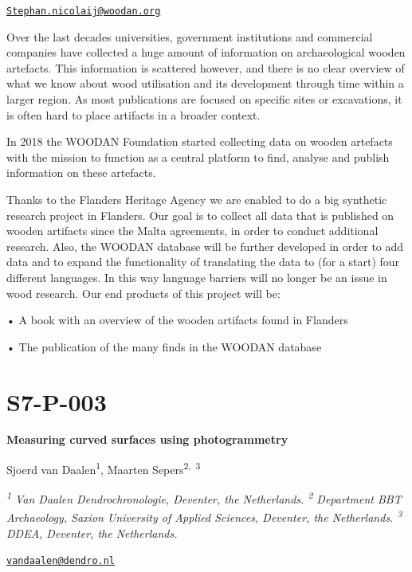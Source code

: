 \documentclass[
]{book}
\begin{document}
\href{mailto:Stephan.nicolaij@woodan.org}{\nolinkurl{Stephan.nicolaij@woodan.org}}

Over the last decades universities, government institutions and commercial companies have collected a huge amount of information on archaeological wooden artefacts. This information is scattered however, and there is no clear overview of what we know about wood utilisation and its development through time within a larger region. As most publications are focused on specific sites or excavations, it is often hard to place artifacts in a broader context.

In 2018 the WOODAN Foundation started collecting data on wooden artefacts with the mission to function as a central platform to find, analyse and publish information on these artefacts.

Thanks to the Flanders Heritage Agency we are enabled to do a big synthetic research project in Flanders. Our goal is to collect all data that is published on wooden artifacts since the Malta agreements, in order to conduct additional research. Also, the WOODAN database will be further developed in order to add data and to expand the functionality of translating the data to (for a start) four different languages. In this way language barriers will no longer be an issue in wood research. Our end products of this project will be:

• A book with an overview of the wooden artifacts found in Flanders

• The publication of the many finds in the WOODAN database

\hypertarget{s7-p-003}{%
\section*{S7-P-003}\label{s7-p-003}}

\textbf{Measuring curved surfaces using photogrammetry}

Sjoerd van Daalen\textsuperscript{1}, Maarten Sepers\textsuperscript{2,~3}

\emph{\textsuperscript{1} Van Daalen Dendrochronologie, Deventer, the Netherlands. \textsuperscript{2} Department BBT Archaeology, Saxion University of Applied Sciences, Deventer, the Netherlands. \textsuperscript{3} DDEA, Deventer, the Netherlands.}

\href{mailto:vandaalen@dendro.nl}{\nolinkurl{vandaalen@dendro.nl}}
\end{document}
